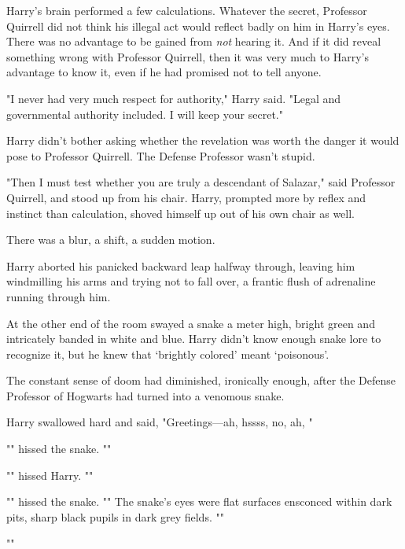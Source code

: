 Harry's brain performed a few calculations. Whatever the secret, Professor
Quirrell did not think his illegal act would reflect badly on him in Harry's
eyes. There was no advantage to be gained from \emph{not} hearing it. And if it
did reveal something wrong with Professor Quirrell, then it was very much to
Harry's advantage to know it, even if he had promised not to tell anyone.

"I never had very much respect for authority," Harry said. "Legal and
governmental authority included. I will keep your secret."

Harry didn't bother asking whether the revelation was worth the danger it would
pose to Professor Quirrell. The Defense Professor wasn't stupid.

"Then I must test whether you are truly a descendant of Salazar," said
Professor Quirrell, and stood up from his chair. Harry, prompted more by reflex
and instinct than calculation, shoved himself up out of his own chair as well.

There was a blur, a shift, a sudden motion.

Harry aborted his panicked backward leap halfway through, leaving him
windmilling his arms and trying not to fall over, a frantic flush of adrenaline
running through him.

At the other end of the room swayed a snake a meter high, bright green and
intricately banded in white and blue. Harry didn't know enough snake lore to
recognize it, but he knew that `brightly colored' meant `poisonous'.

The constant sense of doom had diminished, ironically enough, after the Defense
Professor of Hogwarts had turned into a venomous snake.

Harry swallowed hard and said, "Greetings—ah, hssss, no, ah,
"

"" hissed the snake. ""

"" hissed Harry. ""

"" hissed the snake. "" The snake's eyes were flat surfaces ensconced within dark pits, sharp
black pupils in dark grey fields. ""

""


